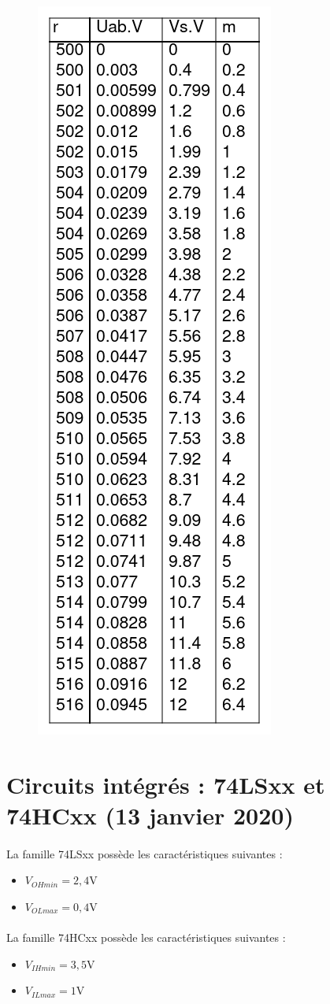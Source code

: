 \documentclass{article}
\begin{document}
\begin{figure}[H]
    \centering
    \includegraphics[width=0.3\linewidth]{./images/cond-balance-export.png}
\end{figure}


\newpage
\section{Circuits intégrés : 74LSxx et 74HCxx (13 janvier 2020)}
\paragraph{}
La famille 74LSxx possède les caractéristiques suivantes :
\begin{itemize}
    \item $V_{OHmin} = 2,4\si{\volt}$
    \item $V_{OLmax} = 0,4\si{\volt}$
\end{itemize}
\paragraph{}
La famille 74HCxx possède les caractéristiques suivantes :
\begin{itemize}
    \item $V_{IHmin} = 3,5\si{\volt}$
    \item $V_{ILmax} = 1\si{\volt}$
\end{itemize}
\end{document}
